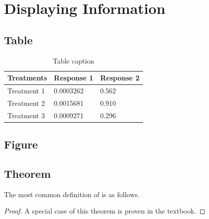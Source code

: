 \clearpage



\section{Displaying Information}

\clearpage


\subsection{Table}

\begin{table}[h]
\centering
\begin{tabular}{l l l}
\toprule
\textbf{Treatments} & \textbf{Response 1} & \textbf{Response 2}\\
\midrule
Treatment 1 & 0.0003262 & 0.562 \\
Treatment 2 & 0.0015681 & 0.910 \\
Treatment 3 & 0.0009271 & 0.296 \\
\bottomrule
\end{tabular}
\caption{Table caption}
\end{table}

\clearpage


\subsection{Figure}



\clearpage


\subsection{Theorem}

The most common definition of  is as follows.


\begin{proof}
A special case of this theorem is proven in the textbook.
\end{proof}

